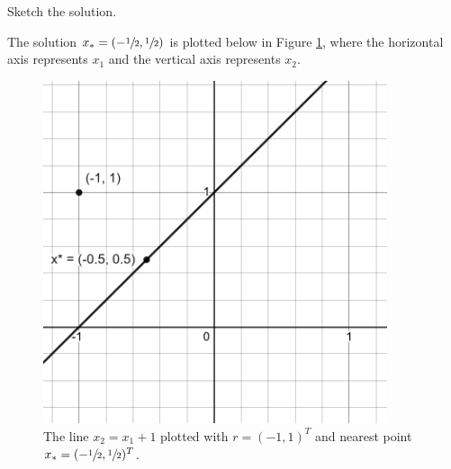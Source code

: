 Sketch the solution.

\begin{solution}

    The solution $x_* = (-\sfrac{1}{2}, \sfrac{1}{2})$ is plotted below in Figure \ref{fig:problem_3d}, where the 
    horizontal axis represents $x_1$ and the vertical axis represents $x_2$.

    \begin{figure}[h]
        \centering
        \includegraphics*[width=0.9\textwidth]{problem_3d.png}
        \caption{The line $x_2 = x_1 + 1$ plotted with $r = (-1, 1)^T$ and nearest point $x_* = (-\sfrac{1}{2}, \sfrac{1}{2})^T$.}
        \label{fig:problem_3d}
    \end{figure}
    \ \\
\end{solution}
